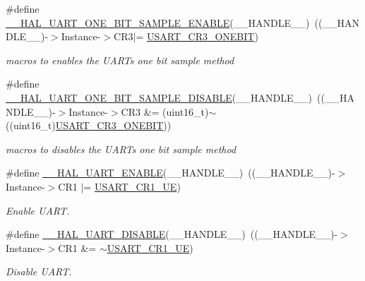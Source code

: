 \begin{DoxyCompactItemize}
\#define \mbox{\hyperlink{group___u_a_r_t___exported___macros_ga3524747e5896296ab066d786431503ce}{\+\_\+\+\_\+\+H\+A\+L\+\_\+\+U\+A\+R\+T\+\_\+\+O\+N\+E\+\_\+\+B\+I\+T\+\_\+\+S\+A\+M\+P\+L\+E\+\_\+\+E\+N\+A\+B\+LE}}(\+\_\+\+\_\+\+H\+A\+N\+D\+L\+E\+\_\+\+\_\+)~((\+\_\+\+\_\+\+H\+A\+N\+D\+L\+E\+\_\+\+\_\+)-\/$>$Instance-\/$>$C\+R3$\vert$= \mbox{\hyperlink{group___peripheral___registers___bits___definition_ga9a96fb1a7beab602cbc8cb0393593826}{U\+S\+A\+R\+T\+\_\+\+C\+R3\+\_\+\+O\+N\+E\+B\+IT}})
\begin{DoxyCompactList}\small\item\em macros to enables the U\+A\+RT\textquotesingle{}s one bit sample method \end{DoxyCompactList}\item 
\#define \mbox{\hyperlink{group___u_a_r_t___exported___macros_ga2dbd7e6592e8c5999f817b69f0fd24bb}{\+\_\+\+\_\+\+H\+A\+L\+\_\+\+U\+A\+R\+T\+\_\+\+O\+N\+E\+\_\+\+B\+I\+T\+\_\+\+S\+A\+M\+P\+L\+E\+\_\+\+D\+I\+S\+A\+B\+LE}}(\+\_\+\+\_\+\+H\+A\+N\+D\+L\+E\+\_\+\+\_\+)~((\+\_\+\+\_\+\+H\+A\+N\+D\+L\+E\+\_\+\+\_\+)-\/$>$Instance-\/$>$C\+R3 \&= (uint16\+\_\+t)$\sim$((uint16\+\_\+t)\mbox{\hyperlink{group___peripheral___registers___bits___definition_ga9a96fb1a7beab602cbc8cb0393593826}{U\+S\+A\+R\+T\+\_\+\+C\+R3\+\_\+\+O\+N\+E\+B\+IT}}))
\begin{DoxyCompactList}\small\item\em macros to disables the U\+A\+RT\textquotesingle{}s one bit sample method \end{DoxyCompactList}\item 
\#define \mbox{\hyperlink{group___u_a_r_t___exported___macros_ga49eb5ea4996a957afeb8be2793ba3fe9}{\+\_\+\+\_\+\+H\+A\+L\+\_\+\+U\+A\+R\+T\+\_\+\+E\+N\+A\+B\+LE}}(\+\_\+\+\_\+\+H\+A\+N\+D\+L\+E\+\_\+\+\_\+)~((\+\_\+\+\_\+\+H\+A\+N\+D\+L\+E\+\_\+\+\_\+)-\/$>$Instance-\/$>$C\+R1 $\vert$=  \mbox{\hyperlink{group___peripheral___registers___bits___definition_ga2bb650676aaae4a5203f372d497d5947}{U\+S\+A\+R\+T\+\_\+\+C\+R1\+\_\+\+UE}})
\begin{DoxyCompactList}\small\item\em Enable U\+A\+RT. \end{DoxyCompactList}\item 
\#define \mbox{\hyperlink{group___u_a_r_t___exported___macros_gad2f9fbdb4adf3a09939e201eaeea072f}{\+\_\+\+\_\+\+H\+A\+L\+\_\+\+U\+A\+R\+T\+\_\+\+D\+I\+S\+A\+B\+LE}}(\+\_\+\+\_\+\+H\+A\+N\+D\+L\+E\+\_\+\+\_\+)~((\+\_\+\+\_\+\+H\+A\+N\+D\+L\+E\+\_\+\+\_\+)-\/$>$Instance-\/$>$C\+R1 \&=  $\sim$\mbox{\hyperlink{group___peripheral___registers___bits___definition_ga2bb650676aaae4a5203f372d497d5947}{U\+S\+A\+R\+T\+\_\+\+C\+R1\+\_\+\+UE}})
\begin{DoxyCompactList}\small\item\em Disable U\+A\+RT. \end{DoxyCompactList}\end{DoxyCompactItemize}


